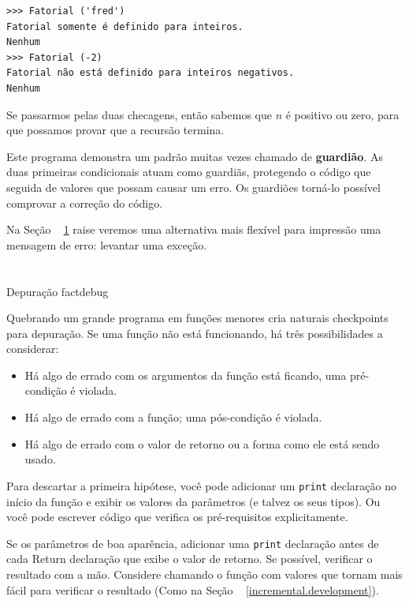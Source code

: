 \documentclass[10pt]{book}
\begin{document}
{{\begin{verbatim}
>>> Fatorial ('fred')
Fatorial somente é definido para inteiros.
Nenhum
>>> Fatorial (-2)
Fatorial não está definido para inteiros negativos.
Nenhum
\end{verbatim}

Se passarmos pelas duas checagens, então sabemos que $ n $ é positivo ou
zero, para que possamos provar que a recursão termina.

Este programa demonstra um padrão muitas vezes chamado de {\bf guardião}.
As duas primeiras condicionais atuam como guardiãs, protegendo o código que
seguida de valores que possam causar um erro. Os guardiões torná-lo
possível comprovar a correção do código.

Na Seção ~ \ref {} raise veremos uma alternativa mais flexível para impressão
uma mensagem de erro: levantar uma exceção.


\section{} Depuração
\label{} factdebug

Quebrando um grande programa em funções menores cria naturais
checkpoints para depuração. 
Se uma função não está funcionando, há
três possibilidades a considerar:

\begin{itemize}

\item Há algo de errado com os argumentos da função
está ficando, uma pré-condição é violada.

\item Há algo de errado com a função; uma pós-condição
é violada.

\item Há algo de errado com o valor de retorno ou a
forma como ele está sendo usado.

\end{itemize}

Para descartar a primeira hipótese, você pode adicionar um {\tt print} declaração
no início da função e exibir os valores da
parâmetros (e talvez os seus tipos). Ou você pode escrever código
que verifica os pré-requisitos explicitamente.

Se os parâmetros de boa aparência, adicionar uma {\tt print} declaração antes de cada
{Return \tt} declaração que exibe o valor de retorno. Se
possível, verificar o resultado com a mão. Considere chamando o
função com valores que tornam mais fácil para verificar o resultado
(Como na Seção ~ \ref {incremental.development}).

}}
\end{document}
